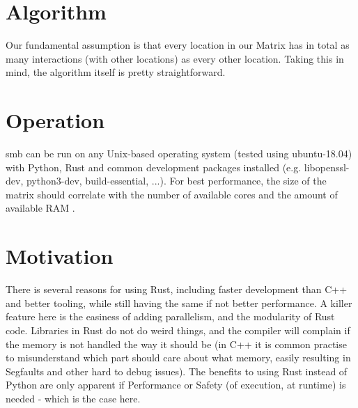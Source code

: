 

\section{Algorithm}\label{sec:algorithm}

 
Our fundamental assumption is that every location in our Matrix has in total as
many interactions (with other locations) as every other location.
Taking this in mind, the algorithm itself is pretty straightforward.


\section{Operation}\label{sec:operation}


smb can be run on any Unix-based operating system (tested using ubuntu-18.04)
with Python, Rust and common development packages installed (e.g.
libopenssl-dev, python3-dev, build-essential, ...). For best performance, the
size of the matrix should correlate with the number of available cores and the
amount of available RAM .



\section{Motivation}\label{sec:motivation}


There is several reasons for using Rust, including faster development than C++
and better tooling, while still having the same if not better performance. A
killer feature here is the easiness of adding parallelism, and the modularity
of Rust code. Libraries in Rust do not do weird things, and the compiler will
complain if the memory is not handled the way it should be (in C++ it is common
practise to misunderstand which part should care about what memory, easily
resulting in Segfaults and other hard to debug issues). The benefits to using
Rust instead of Python are only apparent if Performance or Safety (of
execution, at runtime) is needed - which is the case here.





